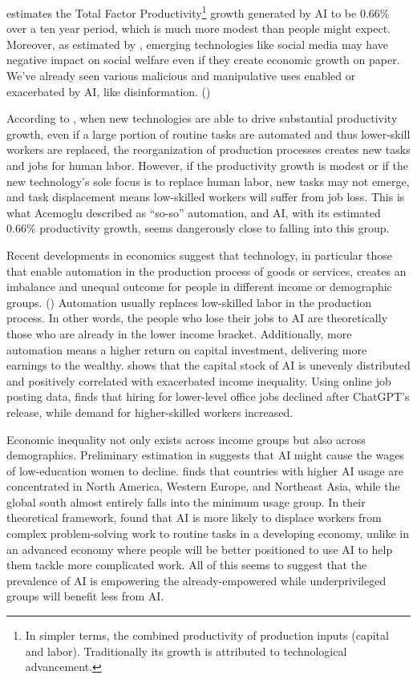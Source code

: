 \documentclass[12pt]{article}
\begin{document}
\cite{NBERw32487} estimates the Total Factor Productivity\footnote{In simpler terms, the combined productivity of production inputs (capital and labor). Traditionally its growth is attributed to technological advancement.} growth generated by AI to be 0.66\% over a ten year period, which is much more modest than people might expect. Moreover, as estimated by \cite{690378712}, emerging technologies like social media may have negative impact on social welfare even if they create economic growth on paper. We've already seen various malicious and manipulative uses enabled or exacerbated by AI, like disinformation. (\cite{csetbuchanan})

According to \cite{10.1093/cjres/rsz022}, when new technologies are able to drive substantial productivity growth, even if a large portion of routine tasks are automated and thus lower-skill workers are replaced, the reorganization of production processes creates new tasks and jobs for human labor. However, if the productivity growth is modest or if the new technology's sole focus is to replace human labor, new tasks may not emerge, and task displacement means low-skilled workers will suffer from job loss. This is what Acemoglu described as ``so-so'' automation, and AI, with its estimated 0.66\% productivity growth, seems dangerously close to falling into this group.

Recent developments in economics suggest that technology, in particular those that enable automation in the production process of goods or services, creates an imbalance and unequal outcome for people in different income or demographic groups. (\cite{https://doi.org/10.3982/ECTA19815, https://doi.org/10.3982/ECTA19417}) Automation usually replaces low-skilled labor in the production process. In other words, the people who lose their jobs to AI are theoretically those who are already in the lower income bracket. Additionally, more automation means a higher return on capital investment, delivering more earnings to the wealthy. \cite{SKARE2024102719} shows that the capital stock of AI is unevenly distributed and positively correlated with exacerbated income inequality. Using online job posting data, \cite{ssrn4874061} finds that hiring for lower-level office jobs declined after ChatGPT's release, while demand for higher-skilled workers increased.

Economic inequality not only exists across income groups but also across demographics. Preliminary estimation in \cite{NBERw32487} suggests that AI might cause the wages of low-education women to decline. \cite{appelmccrorytamkin2025geoapi} finds that countries with higher AI usage are concentrated in North America, Western Europe, and Northeast Asia, while the global south almost entirely falls into the minimum usage group. In their theoretical framework, \cite{doi:10.1086/737233} found that AI is more likely to displace workers from complex problem-solving work to routine tasks in a developing economy, unlike in an advanced economy where people will be better positioned to use AI to help them tackle more complicated work. All of this seems to suggest that the prevalence of AI is empowering the already-empowered while underprivileged groups will benefit less from AI.
\end{document}
